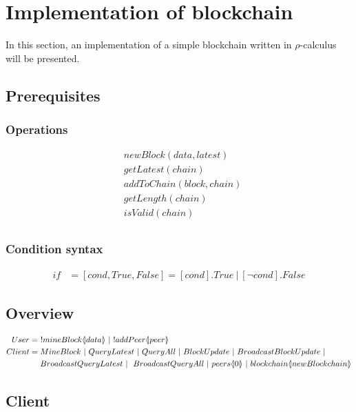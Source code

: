 \section{Implementation of blockchain}
In this section, an implementation of a simple blockchain written in $\rho$-calculus will be presented.

\subsection{Prerequisites}

\subsubsection{Operations}

\begin{align*}
    &newBlock(data,latest)\\
    &getLatest(chain)\\
    &addToChain(block,chain)\\
    &getLength(chain)\\
    &isValid(chain)\\
\end{align*}

\subsubsection{Condition syntax}

\begin{align*}
    if &= [cond,True,False] = [cond].True\ |\ [\neg cond].False
\end{align*}

\subsection{Overview}


\begin{align*}
    User &=\ !mineBlock \lift{}{data}\ |\ !addPeer\lift{}{peer}\\
    Client &= MineBlock\ |\ QueryLatest\ |\ QueryAll\ |\ BlockUpdate\ |\ BroadcastBlockUpdate\ |\\
    &\quad \ BroadcastQueryLatest\ |\ \ BroadcastQueryAll \ |\ peers\lift{}{0}\ |\ blockchain\lift{}{newBlockchain}
\end{align*}

\subsection{Client}

